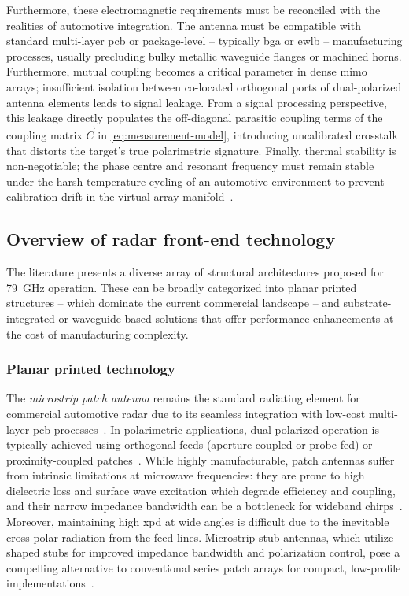 Furthermore, these electromagnetic requirements must be reconciled with the realities of automotive integration.
The antenna must be compatible with standard multi-layer \gls{pcb} or package-level -- typically \gls{bga} or \gls{ewlb} -- manufacturing processes, usually precluding bulky metallic waveguide flanges or machined horns.
Furthermore, mutual coupling becomes a critical parameter in dense \gls{mimo} arrays; insufficient isolation between co-located orthogonal ports of dual-polarized antenna elements leads to signal leakage.
From a signal processing perspective, this leakage directly populates the off-diagonal parasitic coupling terms of the coupling matrix $\vec C$ in \cref{eq:measurement-model}, introducing uncalibrated crosstalk that distorts the target's true polarimetric signature.
Finally, thermal stability is non-negotiable; the phase centre and resonant frequency must remain stable under the harsh temperature cycling of an automotive environment to prevent calibration drift in the virtual array manifold~\parencite{harterErrorAnalysisSelfcalibration2015}.


\subsection{Overview of radar front-end technology}

The literature presents a diverse array of structural architectures proposed for \qty{79}{GHz} operation.
These can be broadly categorized into planar printed structures -- which dominate the current commercial landscape -- and substrate-integrated or waveguide-based solutions that offer performance enhancements at the cost of manufacturing complexity.


\subsubsection{Planar printed technology}

The \emph{microstrip patch antenna} remains the standard radiating element for commercial automotive radar due to its seamless integration with low-cost multi-layer \gls{pcb} processes~\parencite{waldschmidtAutomotiveRadarFirst2021}.
In polarimetric applications, dual-polarized operation is typically achieved using orthogonal feeds (aperture-coupled or probe-fed) or proximity-coupled patches~\parencite{vallecchiDesignDualpolarizedSeriesfed2005,acimovicDualPolarizedMicrostripPatch2008,dengSeriesFedDualPolarizedSingleLayer2019}.
While highly manufacturable, patch antennas suffer from intrinsic limitations at microwave frequencies: they are prone to high dielectric loss and surface wave excitation which degrade efficiency and coupling, and their narrow impedance bandwidth can be a bottleneck for wideband chirps~\parencite{zang77GHzFully2024}.
Moreover, maintaining high \gls{xpd} at wide angles is difficult due to the inevitable cross-polar radiation from the feed lines.
Microstrip stub antennas, which utilize shaped stubs for improved impedance bandwidth and polarization control, pose a compelling alternative to conventional series patch arrays for compact, low-profile implementations~\parencite{tinti45degLinearlyPolarized2023}.

